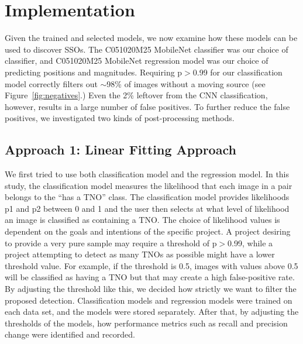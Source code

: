 \documentclass{aastex631}
\begin{document}

\section{Implementation}
\label{sect: Implementation}
Given the trained and selected models, we now examine how these models can be used to discover SSOs.
The C051020M25 MobileNet classifier was our choice of classifier, and C051020M25 MobileNet regression model was our choice of predicting positions and magnitudes.
Requiring p$>$0.99 for our classification model correctly filters out $\sim$98\% of images without a moving source (see Figure~\ref{fig:negatives}.)
Even the 2\% leftover from the CNN classification, however, results in a large number of false positives.
To further reduce the false positives, we investigated two kinds of post-processing methods.


\subsection{Approach 1: Linear Fitting Approach}
\label{Subsect: Linear Fitting Approach}
We first tried to use both classification model and the regression model.
In this study, the classification model measures the likelihood that each image in a pair belongs to the ``has a TNO'' class.
The classification model provides likelihoods p1 and p2 between 0 and 1 and the user then selects at what level of likelihood an image is classified as containing a TNO. 
The choice of likelihood values is dependent on the goals and intentions of the specific project.
A project desiring to provide a very pure sample may require a threshold of p$>$0.99, while a project attempting to detect as many TNOs as possible might have a lower threshold value.
For example, if the threshold is 0.5, images with values above 0.5 will be classified as having a TNO but that may create a high false-positive rate. 
By adjusting the threshold like this, we decided how strictly we want to filter the proposed detection.
Classification models and regression models were trained on each data set, and the models were stored separately.
After that, by adjusting the thresholds of the models, how performance metrics such as recall and precision change were identified and recorded.
\end{document}
